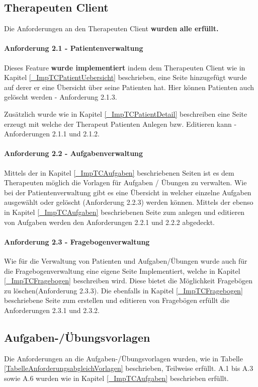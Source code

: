 \subsection{Therapeuten Client}
Die Anforderungen an den Therapeuten Client \textbf{wurden alle erfüllt.}
\paragraph{Anforderung 2.1 - Patientenverwaltung \textcolor{green}{\checkmark}}
Dieses Feature \textbf{wurde implementiert} indem dem Therapeuten Client wie in Kapitel \ref{_ImpTCPatientUebersicht} beschrieben, eine Seite hinzugefügt wurde auf derer er eine Übersicht über seine Patienten hat. Hier können Patienten auch gelöscht werden - Anforderung 2.1.3.

Zusätzlich wurde wie in Kapitel \ref{_ImpTCPatientDetail} beschreiben eine Seite erzeugt mit welche der Therapeut Patienten Anlegen bzw. Editieren kann - Anforderungen 2.1.1 und 2.1.2.

\paragraph{Anforderung 2.2 - Aufgabenverwaltung \textcolor{green}{\checkmark}}
Mittels der in Kapitel \ref{_ImpTCAufgaben} beschriebenen Seiten ist es dem Therapeuten möglich die Vorlagen für Aufgaben / Übungen zu verwalten. Wie bei der Patientenverwaltung gibt es eine Übersicht in welcher einzelne Aufgaben ausgewählt oder gelöscht (Anforderung 2.2.3) werden können. Mittels der ebenso in Kapitel \ref{_ImpTCAufgaben} beschriebenen Seite zum anlegen und editieren von Aufgaben werden den Anforderungen 2.2.1 und 2.2.2 abgedeckt.

\paragraph{Anforderung 2.3 - Fragebogenverwaltung \textcolor{green}{\checkmark}}
Wie für die Verwaltung von Patienten und Aufgaben/Übungen wurde auch für die Fragebogenverwaltung eine eigene Seite Implementiert, welche in Kapitel \ref{_ImpTCFragebogen} beschreiben wird. Diese bietet die Möglichkeit Fragebögen zu löschen(Anforderung 2.3.3). Die ebenfalls in Kapitel \ref{_ImpTCFragebogen} beschriebene Seite zum erstellen und editieren von Fragebögen erfüllt die Anforderungen 2.3.1 und 2.3.2.

\subsection{Aufgaben-/Übungsvorlagen}
Die Anforderungen an die Aufgaben-/Übungsvorlagen wurden, wie in Tabelle \ref{TabelleAnforderungsabgleichVorlagen} beschrieben, Teilweise erfüllt.
A.1 bis A.3 sowie A.6 wurden wie in Kapitel \ref{_ImpTCAufgaben} beschrieben erfüllt. 

